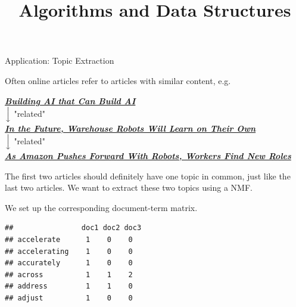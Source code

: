 \documentclass[11pt,compress,t,notes=noshow, xcolor=table]{beamer}
\title{Algorithms and Data Structures}
\begin{document}


\begin{vbframe}{Application: Topic Extraction}

Often online articles refer to articles with similar content, e.g.

\begin{center}
	\textbf{\emph{\href{https://www.nytimes.com/2017/11/05/technology/machine-learning-artificial-intelligence-ai.html?rref=collection\%2Fsectioncollection\%2Ftechnology&action=click&contentCollection=technology&region=rank&module=package&version=highlights&contentPlacement=2&pgtype=sectionfront}{Building AI that Can Build AI}}} \\
	$\Big\downarrow$ \footnotesize{"related"}\\
	\normalsize \textbf{	\emph{\href{https://www.nytimes.com/2017/09/10/business/warehouse-robots-learning.html?action=click&contentCollection=Technology&module=RelatedCoverage&region=Marginalia&pgtype=article}{In the Future, Warehouse Robots Will Learn on Their Own}}} \\
	$\Big\downarrow$ \footnotesize "related"\\
	\normalsize\textbf{	\emph{\href{https://www.nytimes.com/2017/09/10/technology/amazon-robots-workers.html?action=click&contentCollection=Business\%20Day&module=RelatedCoverage&region=Marginalia&pgtype=article}{As Amazon Pushes Forward With Robots, Workers Find New Roles}}}
\end{center}

The first two articles should definitely have one topic in common, just like the last two articles. We want to extract these two topics using a NMF.

\framebreak

We set up the corresponding document-term matrix.

\lz

\begin{footnotesize}
\begin{verbatim}
##                doc1 doc2 doc3
## accelerate      1    0    0
## accelerating    1    0    0
## accurately      1    0    0
## across          1    1    2
## address         1    1    0
## adjust          1    0    0
\end{verbatim}
\end{footnotesize}


\end{vbframe}
\end{document}
